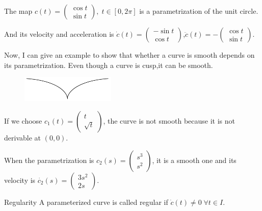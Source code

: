\begin{instance}
    The map $c(t)=\begin{pmatrix}
        \cos t \\ \sin t
    \end{pmatrix},\;t\in[0,2\pi]$ is a parametrization of the unit circle.\par
    And its velocity and acceleration is  $\dot{c}(t)=\begin{pmatrix}
        -\sin t \\ \cos t
    \end{pmatrix}$,$\ddot{c}(t)=-\begin{pmatrix}
        \cos t \\ \sin t
    \end{pmatrix}$.
\end{instance}

Now, I can give an example to show that whether a curve is smooth depends on its parametrization. Even though a curve is cusp,it can be smooth.\par

\begin{instance}
    \begin{figure}[h]
        \centering
        \includegraphics[width=0.4\textwidth]{fig/1.2.png}
    \end{figure}\par
    If we choose $c_1(t)=\begin{pmatrix}
        t \\ \sqrt{t}
    \end{pmatrix}$, the curve is not smooth because it is not derivable at $(0,0)$.\par
    When the parametrization is $c_2(s)=\begin{pmatrix}
        s^3 \\ s^2
    \end{pmatrix}$, it is a smooth one and its velocity is $\dot{c_2}(s)=\begin{pmatrix}
        3s^2 \\ 2s
    \end{pmatrix}$.
\end{instance}

\begin{definition}{Regularity}
    A parameterized curve is called regular if $\dot{c}(t)\neq 0\;\forall t\in I$.
\end{definition}


